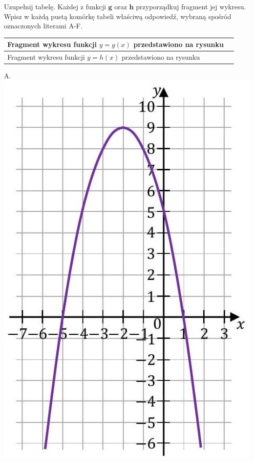 \documentclass[10pt]{article}
\begin{document}
Uzupełnij tabelę. Każdej z funkcji \(\boldsymbol{g}\) oraz \(\boldsymbol{h}\) przyporządkuj fragment jej wykresu. Wpisz w każdą pustą komórkę tabeli właściwą odpowiedź, wybraną spośród oznaczonych literami A-F.

\begin{center}
\begin{tabular}{|l|l|}
\hline
Fragment wykresu funkcji \(y=g(x)\) przedstawiono na rysunku &  \\
\hline
Fragment wykresu funkcji \(y=h(x)\) przedstawiono na rysunku &  \\
\hline
\end{tabular}
\end{center}

A.\\
\includegraphics[max width=\textwidth, center]{2024_11_21_daeb5e5efb43dd4cb535g-14(1)}\\
\end{document}
